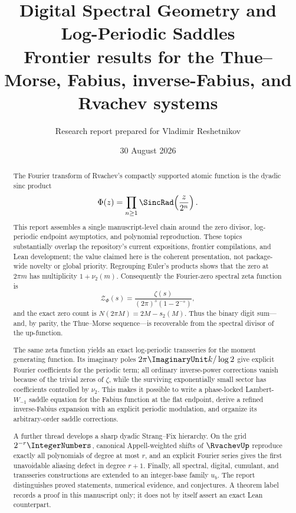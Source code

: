 \documentclass[11pt,oneside]{article}
\title{\bfseries Digital Spectral Geometry and Log-Periodic Saddles\\[0.35em]
\large Frontier results for the Thue--Morse, Fabius, inverse-Fabius,
and Rvachev systems}
\author{Research report prepared for Vladimir Reshetnikov}
\date{30 August 2026}
\theoremstyle{definition}
\theoremstyle{remark}
\begin{document}
\maketitle

\begin{abstract}
The Fourier transform of Rvachev's compactly supported atomic function is the
dyadic sinc product
\[
 \Phi(z)=\prod_{n\geq1}\SincRad\!\left(\frac{z}{2^n}\right).
\]
This report assembles a single manuscript-level chain around the zero divisor,
log-periodic endpoint asymptotics, and polynomial reproduction.  These topics
substantially overlap the repository's current expositions, frontier
compilations, and Lean development; the value claimed here is the coherent
presentation, not package-wide novelty or global priority.  Regrouping
Euler's products shows that the zero at \(2\pi m\) has multiplicity
\(1+\nu_2(m)\).  Consequently the Fourier-zero spectral zeta function is
\[
 \mathcal Z_\Phi(s)
 =\frac{\zeta(s)}{(2\pi)^s(1-2^{-s})},
\]
and the exact zero count is \(N(2\pi M)=2M-s_2(M)\).  Thus the binary digit
sum---and, by parity, the Thue--Morse sequence---is recoverable from the
spectral divisor of the up-function.

The same zeta function yields an exact log-periodic transseries for the moment
generating function.  Its imaginary poles
\(2\pi\ImaginaryUnit k/\log2\) give explicit Fourier coefficients for the periodic term;
all ordinary inverse-power corrections vanish because of the trivial zeros of
\(\zeta\), while the surviving exponentially small sector has coefficients
controlled by \(\nu_2\).  This makes it possible to write a phase-locked
Lambert-\(W_{-1}\) saddle equation for the Fabius function at the flat endpoint,
derive a refined inverse-Fabius expansion with an explicit periodic
modulation, and organize its arbitrary-order saddle corrections.

A further thread develops a sharp dyadic Strang--Fix hierarchy.  On the grid
\(2^{-r}\IntegerNumbers\), canonical Appell-weighted shifts of \(\RvachevUp\) reproduce exactly
all polynomials of degree at most \(r\), and an explicit Fourier series gives
the first unavoidable aliasing defect in degree \(r+1\).  Finally, all spectral,
digital, cumulant, and transseries constructions are extended to an
integer-base family \(u_b\).  The report distinguishes proved statements,
numerical evidence, and conjectures.  A theorem label records a proof in this
manuscript only; it does not by itself assert an exact Lean counterpart.
\end{abstract}
\end{document}
